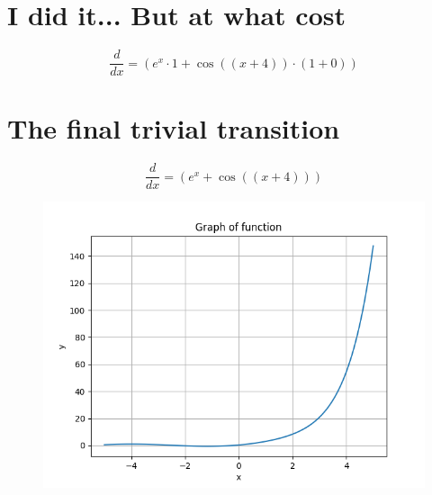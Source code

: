 \documentclass[a4paper, 12pt]{article}
\begin{document}
\section{I did it... But at what cost}\begin{equation*}
    \frac{d}{dx} = ({{{{e}}^{{x}}}\cdot{{1}}}+{{\cos({({{x}}+{{4}})})}\cdot{({{1}}+{{0}})}})
\end{equation*}

\section{The final trivial transition}\begin{equation*}
    \frac{d}{dx} = ({{{e}}^{{x}}}+{\cos({({{x}}+{{4}})})})
\end{equation*}

\begin{figure}[h!]
        \centering
         \includegraphics[scale=0.5]{./LaTeX/tex_pics/differ.png}
\end{figure}
\end{document}
